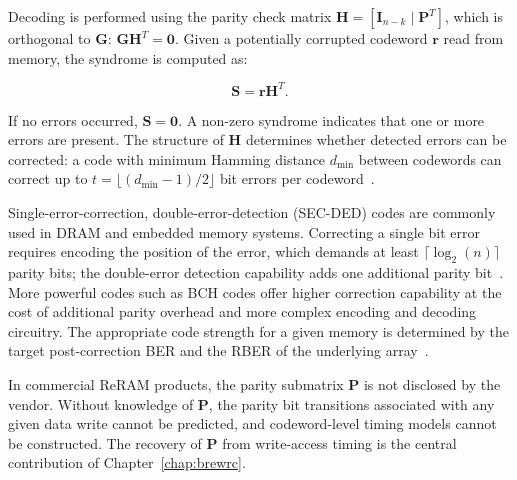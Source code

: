 Decoding is performed using the parity check matrix $\mathbf{H} =
	[\mathbf{I}_{n-k} \mid \mathbf{P}^T]$, which is orthogonal to
$\mathbf{G}$: $\mathbf{G}\mathbf{H}^T = \mathbf{0}$. Given a potentially
corrupted codeword $\mathbf{r}$ read from memory, the syndrome is
computed as:

\begin{equation}
	\label{eqn:codeword-syndrome}
	\mathbf{S} = \mathbf{r}\mathbf{H}^T.
\end{equation}

If no errors occurred, $\mathbf{S} = \mathbf{0}$. A non-zero syndrome
indicates that one or more errors are present. The structure of
$\mathbf{H}$ determines whether detected errors can be corrected: a code
with minimum Hamming distance $d_\text{min}$ between codewords can
correct up to $t = \lfloor(d_\text{min} - 1)/2\rfloor$ bit errors per
codeword~\cite{hamming1950error, sklar2004abcs}.

Single-error-correction, double-error-detection (SEC-DED) codes are
commonly used in DRAM and embedded memory systems. Correcting a single
bit error requires encoding the position of the error, which demands at
least $\lceil\log_2(n)\rceil$ parity bits; the double-error detection
capability adds one additional parity bit~\cite{sklar2004abcs}. More
powerful codes such as BCH codes offer higher correction capability at
the cost of additional parity overhead and more complex encoding and
decoding circuitry. The appropriate code strength for a given memory is
determined by the target post-correction BER and the RBER of the
underlying array~\cite{hayakawa2017resolving,
	fukuyama2019comprehensive}.

In commercial ReRAM products, the parity submatrix $\mathbf{P}$ is not
disclosed by the vendor. Without knowledge of $\mathbf{P}$, the parity
bit transitions associated with any given data write cannot be
predicted, and codeword-level timing models cannot be constructed. The
recovery of $\mathbf{P}$ from write-access timing is the central
contribution of Chapter~\ref{chap:brewrc}.